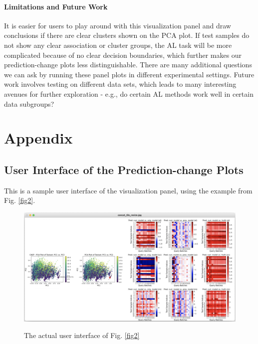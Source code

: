 \documentclass{article}
\begin{document}
\paragraph{Limitations and Future Work}
It is easier for users to play around with this visualization panel and draw conclusions if there are clear clusters shown on the PCA plot. If test samples do not show any clear association or cluster groups, the AL task will be more complicated because of no clear decision boundaries, which further makes our prediction-change plots less distinguishable. There are many additional questions we can ask by running these panel plots in different experimental settings. Future work involves testing on different data sets, which leads to many interesting avenues for further exploration - e.g., do certain AL methods work well in certain data subgroups? %



 


\appendix

\section{Appendix}

\subsection{User Interface of the Prediction-change Plots}

This is a sample user interface of the visualization panel, using the example from Fig. \ref{fig2}. 

\begin{figure}[h]

 \includegraphics[width=0.99\linewidth]{appendix_figure3.png}
 {
 }
 \caption{The actual user interface of Fig. \ref{fig2}}
 \centering
\label{fig3}
\end{figure}
\end{document}
